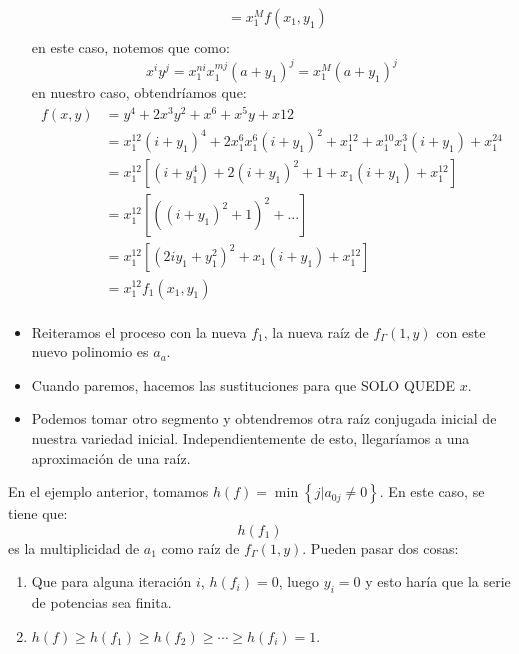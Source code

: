 \documentclass[12pt]{report}
\newcounter{it}
\theoremstyle{largebreak}
\begin{document}
\begin{exa}
\begin{itemize}
\begin{equation*}
\begin{split}
                    &=x_1^Mf(x_1,y_1)\\
                \end{split}
            \end{equation*}
            en este caso, notemos que como:
            \begin{equation*}
                x^iy^j=x_1^{ ni}x_1^{ mj}(a+y_1)^j=x_1^M(a+y_1)^j
            \end{equation*}
            en nuestro caso, obtendríamos que:
            \begin{equation*}
                \begin{split}
                    f(x,y)&=y^4+2x^3y^2+x^6+x^5y+x{12}\\
                    &=x_1^{12}(i+y_1)^4+2x_1^6x_1^6(i+y_1)^2+x_1^{12}+x_1^{10}x_1^3(i+y_1)+x_1^{24}\\
                    &=x_1^{12}\left[(i+y_1^4)+2(i+y_1)^2+1+x_1(i+y_1)+x_1^{12}\right]\\
                    &=x_1^{12}\left[\left((i+y_1)^2+1\right)^2+... \right]\\
                    &=x_1^{12}\left[(2iy_1+y_1^2)^2+x_1(i+y_1)+x_1^{12}\right]\\
                    &=x_1^{12}f_1(x_1,y_1)\\
                \end{split}
            \end{equation*}
            \item Reiteramos el proceso con la nueva $f_1$, la nueva raíz de $f_\Gamma(1,y)$ con este nuevo polinomio es $a_a$.
            \item Cuando paremos, hacemos las sustituciones para que SOLO QUEDE $x$.
            \item Podemos tomar otro segmento y obtendremos otra raíz conjugada inicial de nuestra variedad inicial. Independientemente de esto, llegaríamos a una aproximación de una raíz.
        \end{itemize}
        En el ejemplo anterior, tomamos $h(f)=\min\left\{j\Big|a_{ 0j}\neq0 \right\}$. En este caso, se tiene que:
        \begin{equation*}
            h(f_1)
        \end{equation*}
        es la multiplicidad de $a_1$ como raíz de $f_\Gamma(1,y)$. Pueden pasar dos cosas:
        \begin{enumerate}
            \item Que para alguna iteración $i$, $h(f_i)=0$, luego $y_i=0$ y esto haría que la serie de potencias sea finita.
            \item $h(f)\geq h(f_1)\geq h(f_2)\geq\cdots\geq h(f_i)=1$.
        \end{enumerate}
    \end{exa}
\end{document}
